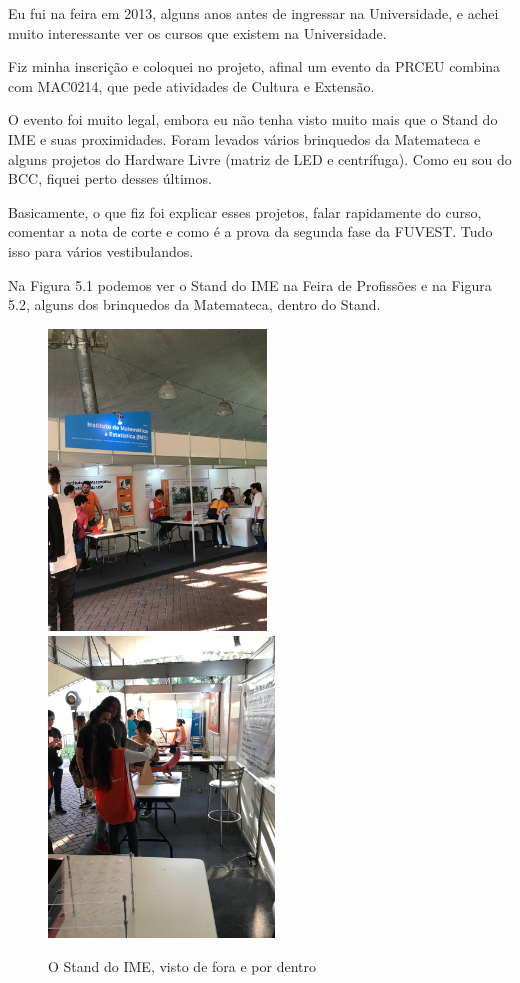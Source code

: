 \documentclass[12pt,letterpaper]{article}
\begin{document}
	Eu fui na feira em 2013, alguns anos antes de ingressar na Universidade, e achei muito interessante ver os cursos que existem na Universidade.
	
	Fiz minha inscrição e coloquei no projeto, afinal um evento da PRCEU combina com MAC0214, que pede atividades de Cultura e Extensão.
	
	O evento foi muito legal, embora eu não tenha visto muito mais que o Stand do IME e suas proximidades. Foram levados vários brinquedos da Matemateca e alguns projetos do Hardware Livre (matriz de LED e centrífuga). Como eu sou do BCC, fiquei perto desses últimos.

	Basicamente, o que fiz foi explicar esses projetos, falar rapidamente do curso, comentar a nota de corte e como é a prova da segunda fase da FUVEST. Tudo isso para vários vestibulandos. 
	
	Na Figura 5.1 podemos ver o Stand do IME na Feira de Profissões e na Figura 5.2, alguns dos brinquedos da Matemateca, dentro do Stand.
	
	\begin{figure}
		\begin{center}
			\includegraphics[height=8cm]{stand.JPG}
			\includegraphics[height=8cm]{dentro.JPG}  
			\caption{O Stand do IME, visto de fora e por dentro} 
		\end{center}
	\end{figure}
\end{document}

